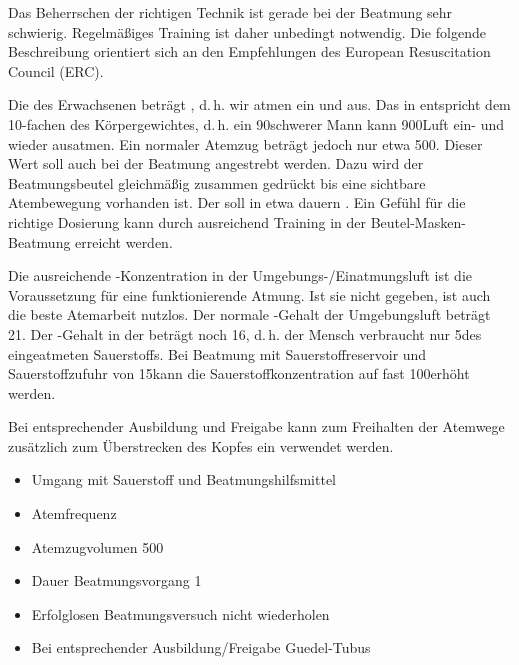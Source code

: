 {
Das Beherrschen der richtigen Technik ist gerade bei der
Beatmung sehr schwierig. Regelmäßiges Training ist daher
unbedingt notwendig. Die folgende Beschreibung orientiert
sich an den Empfehlungen des European Resuscitation Council
(ERC).

Die  des Erwachsenen beträgt
\PerMin*, d.\,h. wir atmen
\PerMin* ein und aus. Das
 in {\Ml}
entspricht dem 10-fachen des Körpergewichtes, d.\,h. ein
90\Kg* schwerer Mann kann 900\Ml* Luft ein- und wieder
ausatmen.
Ein normaler Atemzug beträgt jedoch nur etwa
500\Ml*{}. Dieser Wert soll auch
bei der Beatmung angestrebt werden. Dazu wird der
Beatmungsbeutel gleichmäßig zusammen gedrückt bis eine
sichtbare Atembewegung vorhanden ist. Der
 soll in etwa \EE{1\Sec*} dauern
\cite{Erc2010Sek02De}. Ein Gefühl für die richtige Dosierung
kann durch ausreichend Training in der
Beutel-Masken-Beatmung erreicht werden.

Die ausreichende -Konzentration in der
Umgebungs-/Einatmungsluft ist die Voraussetzung für eine
funktionierende Atmung. Ist sie nicht gegeben, ist auch die
beste Atemarbeit nutzlos. Der normale -Gehalt der
Umgebungsluft beträgt 21\PC*. Der -Gehalt in der
 beträgt noch 16\PC*, d.\,h. der Mensch
verbraucht  nur 5\PC* des eingeatmeten Sauerstoffs. Bei
Beatmung mit Sauerstoffreservoir und Sauerstoffzufuhr von
15\LPerMin* kann die Sauerstoffkonzentration auf fast
100\PC* erhöht werden.


Bei entsprechender Ausbildung und Freigabe kann zum
Freihalten der Atemwege zusätzlich zum
Überstrecken des Kopfes ein
 verwendet werden. 
}{
\begin{itemize}
  \item Umgang mit Sauerstoff und Beatmungshilfsmittel
  \item Atemfrequenz \PerMin*
  \item Atemzugvolumen 500\Ml*
  \item Dauer Beatmungsvorgang 1\Sec*
  \item Erfolglosen Beatmungsversuch nicht wiederholen
  \item Bei entsprechender Ausbildung/Freigabe
  Guedel-Tubus
\end{itemize}
}{}{}{}

